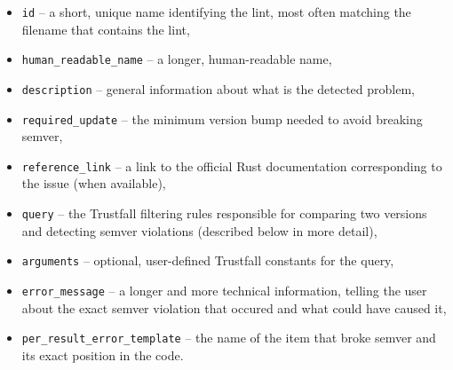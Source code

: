 \documentclass[licencjacka,en]{pracamgr}
\begin{document}
\begin{itemize}
	\item \texttt{id} -- a short, unique name identifying the lint, most often matching the
		filename that contains the lint,
	\item \texttt{human\_readable\_name} -- a longer, human-readable name,
	\item \texttt{description} -- general information about what is the detected problem,
	\item \texttt{required\_update} -- the minimum version bump needed to avoid breaking semver,
	\item \texttt{reference\_link} -- a link to the official Rust documentation corresponding to
		the issue (when available),
	\item \texttt{query} -- the Trustfall filtering rules responsible for comparing two versions and
		detecting semver violations (described below in more detail),
	\item \texttt{arguments} -- optional, user-defined Trustfall constants for the query,
	\item \texttt{error\_message} -- a longer and more technical information, telling the user
	    about the exact semver violation that occured and what could have caused it,
	\item \texttt{per\_result\_error\_template} -- the name of the item that broke semver and
	    its exact position in the code.
\end{itemize}
\end{document}
